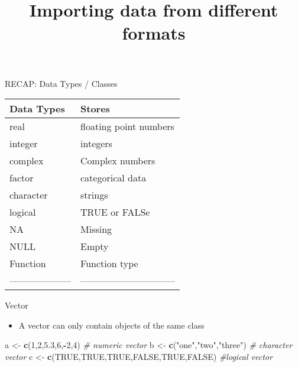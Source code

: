 \documentclass[
  ignorenonframetext,
]{beamer}
\title{Importing data from different formats}
\author{}
\date{\vspace{-2.5em}}
\newenvironment{Shaded}{\begin{snugshade}}{\end{snugshade}}
\newcommand{\CommentTok}[1]{\textcolor[rgb]{0.56,0.35,0.01}{\textit{#1}}}
\newcommand{\DecValTok}[1]{\textcolor[rgb]{0.00,0.00,0.81}{#1}}
\newcommand{\FloatTok}[1]{\textcolor[rgb]{0.00,0.00,0.81}{#1}}
\newcommand{\KeywordTok}[1]{\textcolor[rgb]{0.13,0.29,0.53}{\textbf{#1}}}
\newcommand{\NormalTok}[1]{#1}
\newcommand{\OperatorTok}[1]{\textcolor[rgb]{0.81,0.36,0.00}{\textbf{#1}}}
\newcommand{\OtherTok}[1]{\textcolor[rgb]{0.56,0.35,0.01}{#1}}
\newcommand{\StringTok}[1]{\textcolor[rgb]{0.31,0.60,0.02}{#1}}
\providecommand{\tightlist}{%
  \setlength{\itemsep}{0pt}\setlength{\parskip}{0pt}}
\begin{document}
\frame{\titlepage}

\begin{frame}{RECAP: Data Types / Classes}
\protect\hypertarget{recap-data-types-classes}{}

\begin{longtable}[]{@{}ll@{}}
\toprule
Data Types & Stores\tabularnewline
\midrule
\endhead
real & floating point numbers\tabularnewline
integer & integers\tabularnewline
complex & Complex numbers\tabularnewline
factor & categorical data\tabularnewline
character & strings\tabularnewline
logical & TRUE or FALSe\tabularnewline
NA & Missing\tabularnewline
NULL & Empty\tabularnewline
Function & Function type\tabularnewline
-------------------- & ------------------------------\tabularnewline
\bottomrule
\end{longtable}

\end{frame}

\begin{frame}[fragile]{Vector}
\protect\hypertarget{vector}{}

\begin{itemize}
\tightlist
\item
  A vector can only contain objects of the same class
\end{itemize}

\begin{Shaded}
\begin{Highlighting}[]
\NormalTok{a <-}\StringTok{ }\KeywordTok{c}\NormalTok{(}\DecValTok{1}\NormalTok{,}\DecValTok{2}\NormalTok{,}\FloatTok{5.3}\NormalTok{,}\DecValTok{6}\NormalTok{,}\OperatorTok{-}\DecValTok{2}\NormalTok{,}\DecValTok{4}\NormalTok{) }\CommentTok{# numeric vector}
\NormalTok{b <-}\StringTok{ }\KeywordTok{c}\NormalTok{(}\StringTok{"one"}\NormalTok{,}\StringTok{"two"}\NormalTok{,}\StringTok{"three"}\NormalTok{) }\CommentTok{# character vector}
\NormalTok{c <-}\StringTok{ }\KeywordTok{c}\NormalTok{(}\OtherTok{TRUE}\NormalTok{,}\OtherTok{TRUE}\NormalTok{,}\OtherTok{TRUE}\NormalTok{,}\OtherTok{FALSE}\NormalTok{,}\OtherTok{TRUE}\NormalTok{,}\OtherTok{FALSE}\NormalTok{) }\CommentTok{#logical vector}
\end{Highlighting}
\end{Shaded}

\end{frame}
\end{document}
